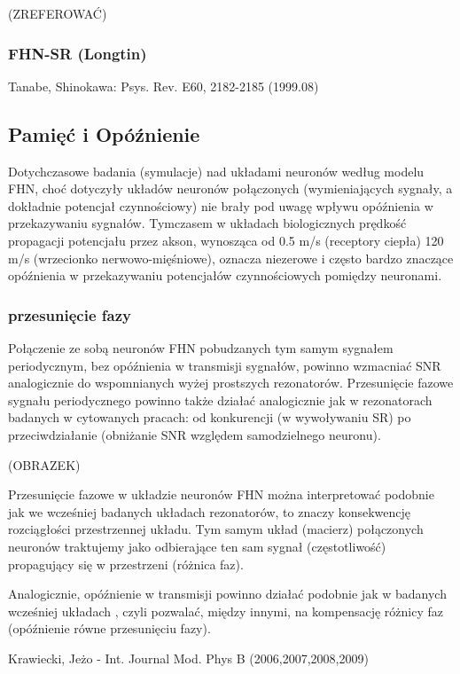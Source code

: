 \documentclass[12pt]{article}
\begin{document}
  (ZREFEROWAĆ)

  \subsubsection{FHN-SR (Longtin)}


  Tanabe, Shinokawa: Psys. Rev. E60, 2182-2185 (1999.08)
  
  \subsection{Pamięć i Opóźnienie}
  
  Dotychczasowe badania (symulacje) nad układami neuronów według modelu FHN, choć dotyczyły układów neuronów połączonych (wymieniających sygnały, a dokładnie potencjał czynnościowy) nie brały pod uwagę wpływu opóźnienia w przekazywaniu sygnałów. Tymczasem w układach biologicznych prędkość propagacji potencjału przez akson, wynosząca od 0.5 m/s (receptory ciepła) 120 m/s (wrzecionko nerwowo-mięśniowe), oznacza niezerowe i często bardzo znaczące opóźnienia w przekazywaniu potencjałów czynnościowych pomiędzy neuronami.

  \subsubsection{przesunięcie fazy}

  Połączenie ze sobą neuronów FHN pobudzanych tym samym sygnałem periodycznym, bez opóźnienia w transmisji sygnałów, powinno wzmacniać SNR analogicznie do wspomnianych wyżej prostszych rezonatorów. Przesunięcie fazowe sygnału periodycznego powinno także działać analogicznie jak w rezonatorach badanych w cytowanych pracach: od konkurencji (w wywoływaniu SR) po przeciwdziałanie (obniżanie SNR względem samodzielnego neuronu). \cite{ijmpb_14_8}

  (OBRAZEK)

  Przesunięcie fazowe w układzie neuronów FHN można interpretować podobnie jak we wcześniej badanych układach rezonatorów, to znaczy konsekwencję rozciągłości przestrzennej układu. Tym samym układ (macierz) połączonych neuronów traktujemy jako odbierające ten sam sygnał (częstotliwość) propagujący się w przestrzeni (różnica faz).

  Analogicznie, opóźnienie w transmisji powinno działać podobnie jak w badanych wcześniej układach \cite{ijmpb_23_2}, czyli pozwalać, między innymi, na kompensację różnicy faz (opóźnienie równe przesunięciu fazy).

  Krawiecki, Jeżo - Int. Journal Mod. Phys B (2006,2007,2008,2009)
\end{document}
